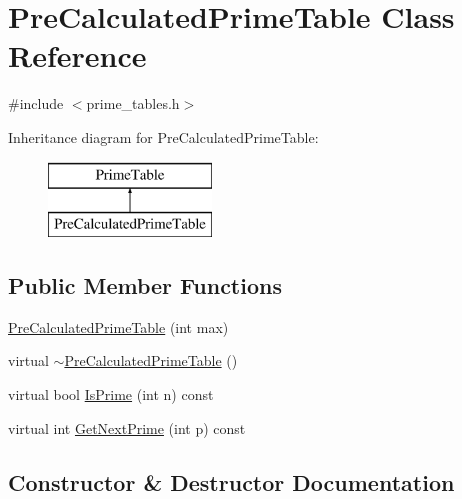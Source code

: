 \hypertarget{class_pre_calculated_prime_table}{}\section{Pre\+Calculated\+Prime\+Table Class Reference}
\label{class_pre_calculated_prime_table}


{\ttfamily \#include $<$prime\+\_\+tables.\+h$>$}

Inheritance diagram for Pre\+Calculated\+Prime\+Table\+:\begin{figure}[H]
\begin{center}
\leavevmode
\includegraphics[height=2.000000cm]{class_pre_calculated_prime_table}
\end{center}
\end{figure}
\subsection*{Public Member Functions}
\begin{DoxyCompactItemize}
\item 
\hyperlink{class_pre_calculated_prime_table_a6bb947504421e31da70d2c71576be350}{Pre\+Calculated\+Prime\+Table} (int max)
\item 
virtual \hyperlink{class_pre_calculated_prime_table_a6ceab295f80dbe2766b8d4f54138bbc4}{$\sim$\+Pre\+Calculated\+Prime\+Table} ()
\item 
virtual bool \hyperlink{class_pre_calculated_prime_table_ae3d0da99f18f4b57d8d63ecebfd65106}{Is\+Prime} (int n) const 
\item 
virtual int \hyperlink{class_pre_calculated_prime_table_a405c77ebe22cd11d7782ea264502ed39}{Get\+Next\+Prime} (int p) const 
\end{DoxyCompactItemize}


\subsection{Constructor \& Destructor Documentation}
\hypertarget{class_pre_calculated_prime_table_a6bb947504421e31da70d2c71576be350}{}
